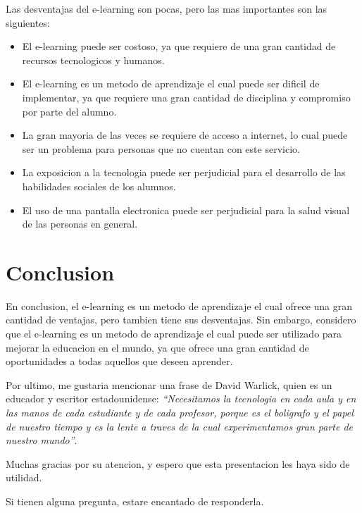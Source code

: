 Las desventajas del e-learning son pocas, pero las mas importantes son las 
siguientes: 

\begin{itemize}
    \item El e-learning puede ser costoso, ya que requiere de una gran cantidad 
        de recursos tecnologicos y humanos.

    \item El e-learning es un metodo de aprendizaje el cual puede ser dificil de 
        implementar, ya que requiere una gran cantidad de disciplina y 
        compromiso por parte del alumno.

    \item La gran mayoria de las veces se requiere de acceso a internet, lo cual 
        puede ser un problema para personas que no cuentan con este servicio.

    \item La exposicion a la tecnologia puede ser perjudicial para el desarrollo 
        de las habilidades sociales de los alumnos.
    
    \item El uso de una pantalla electronica puede ser perjudicial para la 
        salud visual de las personas en general.

\end{itemize}

\section{Conclusion}

En conclusion, el e-learning es un metodo de aprendizaje el cual ofrece una gran 
cantidad de ventajas, pero tambien tiene sus desventajas. Sin embargo, 
considero que el e-learning es un metodo de aprendizaje el cual puede ser 
utilizado para mejorar la educacion en el mundo, ya que ofrece una gran 
cantidad de oportunidades a todas aquellos que deseen aprender.

Por ultimo, me gustaria mencionar una frase de David Warlick, quien es un 
educador y escritor estadounidense: \textit{``Necesitamos la tecnologia en 
cada aula y en las manos de cada estudiante y de cada profesor, porque 
es el boligrafo y el papel de nuestro tiempo y es la lente a traves de la cual 
experimentamos gran parte de nuestro mundo''}.

Muchas gracias por su atencion, y espero que esta presentacion les haya sido 
de utilidad. 

Si tienen alguna pregunta, estare encantado de responderla.
